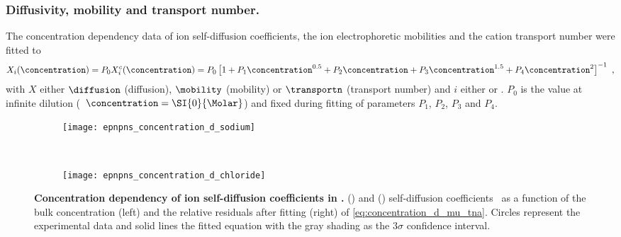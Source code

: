 \subsubsection{Diffusivity, mobility and transport number.}
%
The  concentration dependency data of ion self-diffusion coefficients, the ion electrophoretic
mobilities and the cation transport number were fitted to
%
\begin{align}\label{eq:concentration_d_mu_tna}
  X_{i} (\concentration) = P_0 X_{i}^c (\concentration) =
  P_0 \left[ 1
           + P_1 \concentration^{0.5}
           + P_2 \concentration
           + P_3 \concentration^{1.5}
           + P_4 \concentration^2 
      \right]^{-1}
  \text{ ,}
\end{align}
%
with $X$ either $\diffusion$ (diffusion), $\mobility$ (mobility) or $\transportn$ (transport number) and $i$
either \Na{} or \Cl{}. $P_0$ is the value at infinite dilution (\ie~$\concentration = \SI{0}{\Molar}$) and
fixed during fitting of parameters $P_1$, $P_2$, $P_3$ and $P_4$.

%
\begin{figure*}[!b]
  \centering

  \begin{subfigure}[t]{11cm}
    \centering
    \caption{}\vspace{-1mm}\label{fig:epnpns_concentration_d_sodium}
    \texttt{[image: epnpns\_concentration\_d\_sodium]}
  \end{subfigure}
  \\
  \begin{subfigure}[t]{11cm}
    \centering
    \caption{}\vspace{-1mm}\label{fig:epnpns_concentration_d_chloride}
    \texttt{[image: epnpns\_concentration\_d\_chloride]}
  \end{subfigure}

  \caption[Concentration depend. of ion self-diffusion coefficients in ]%
    {%
      \textbf{Concentration dependency of ion self-diffusion coefficients in .}
      ()
      \Na{} and
      ()
      \Cl{} self-diffusion coefficients~\cite{Mills-1989} as a function of the bulk  concentration
      (left) and the relative residuals after fitting (right) of \cref{eq:concentration_d_mu_tna}. Circles
      represent the experimental data and solid lines the fitted equation with the gray shading as the
      $3\sigma$ confidence interval.
  }\label{fig:epnpns_concentration_d}
\end{figure*}
%

